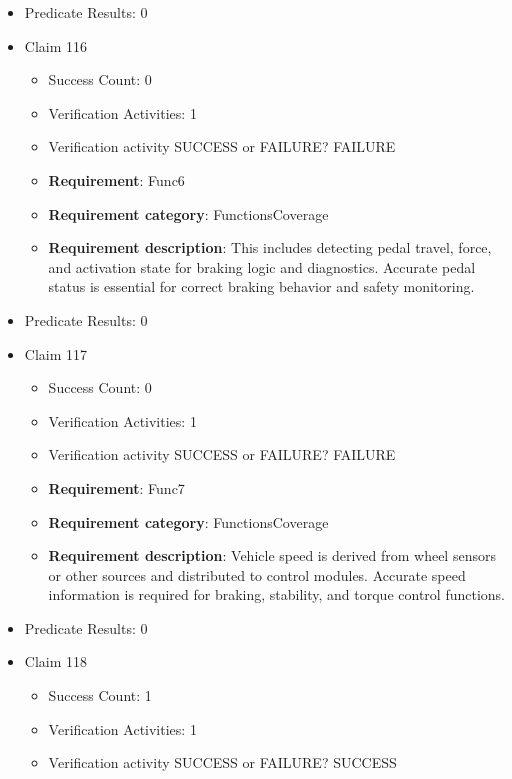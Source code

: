 \documentclass{article}
\begin{document}
\begin{itemize}
\begin{itemize}
				\end{itemize}
				
									    
				\item Predicate Results: 0

  				  \item Claim 116
				\begin{itemize}
			    	\item Success Count: 0 
			    	\item Verification Activities: 1
					\item Verification activity SUCCESS or FAILURE? FAILURE
		
						\item \textbf{Requirement}: Func6 
						\item \textbf{Requirement category}: FunctionsCoverage 
						\item \textbf{Requirement description}: This includes detecting pedal travel, force, and activation state for braking logic and diagnostics. Accurate pedal status is essential for correct braking behavior and safety monitoring.
					
				\end{itemize}
				
									    
				\item Predicate Results: 0

  				  \item Claim 117
				\begin{itemize}
			    	\item Success Count: 0 
			    	\item Verification Activities: 1
					\item Verification activity SUCCESS or FAILURE? FAILURE
		
						\item \textbf{Requirement}: Func7 
						\item \textbf{Requirement category}: FunctionsCoverage 
						\item \textbf{Requirement description}: Vehicle speed is derived from wheel sensors or other sources and distributed to control modules. Accurate speed information is required for braking, stability, and torque control functions.
					
				\end{itemize}
				
									    
				\item Predicate Results: 0

  				  \item Claim 118
				\begin{itemize}
			    	\item Success Count: 1 
			    	\item Verification Activities: 1
					\item Verification activity SUCCESS or FAILURE? SUCCESS
		

\end{itemize}
\end{itemize}
\end{document}
